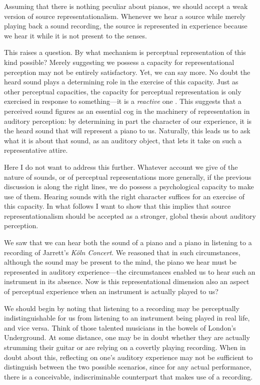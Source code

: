 \documentclass[sloppy, journal, git, anonymise, dodraft]{humapap}
\begin{document}
Assuming that there is nothing peculiar about pianos, we should accept a
weak version of source representationalism. Whenever we hear a source
while merely playing back a sound recording, the source is represented
in experience because we hear it while it is not present to the senses.

This raises a question. By what mechanism is perceptual representation
of this kind possible? Merely suggesting we possess a capacity for
representational perception may not be entirely satisfactory. Yet, we
can say more. No doubt the heard sound plays a determining role in the
exercise of this capacity. Just as other perceptual capacities, the
capacity for perceptual representation is only exercised in response to
something---it is a \emph{reactive} one
\autocite[cf.][]{kalderon2014aa}. This suggests that a perceived sound
figures as an essential cog in the machinery of representation in
auditory perception: by determining in part the character of our
experience, it is the heard sound that will represent a piano to us.
Naturally, this leads us to ask what it is about that sound, as an
auditory object, that lets it take on such a representative attire.

Here I do not want to address this further. Whatever account we give of
the nature of sounds, or of perceptual representations more generally,
if the previous discussion is along the right lines, we do possess a
psychological capacity to make use of them. Hearing sounds with the right character suffices for an exercise of this capacity. In what follows I want to
show that this implies that source representationalism should be accepted as a stronger, global thesis about auditory perception.

\sect We saw that we can hear both the sound of a piano and a piano in
listening to a recording of Jarrett's \emph{Köln Concert}. We reasoned
that in such circumstances, although the sound may be present to the
mind, the piano we hear must be represented in auditory
experience---the circumstances enabled us to hear such an instrument in
its absence. Now is this representational dimension also an aspect of
perceptual experience when an instrument is actually played to us?

We should begin by noting that listening to a recording may be
perceptually indistinguishable for us from listening to an instrument
being played in real life, and vice versa. Think of those talented
musicians in the bowels of London's Underground. At some distance, one
may be in doubt whether they are actually strumming their guitar or are
relying on a covertly playing recording. When in doubt about this,
reflecting on one's auditory experience may not be sufficient to
distinguish between the two possible scenarios, since for any actual
performance, there is a conceivable, indiscriminable counterpart that
makes use of a recording.
\end{document}
